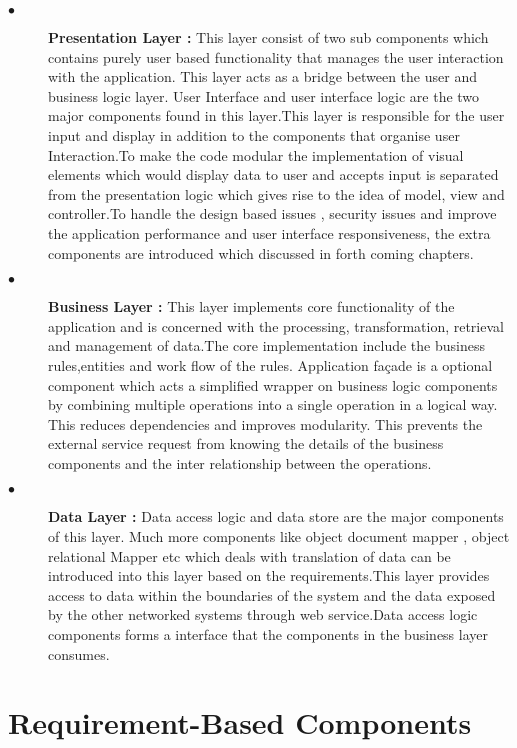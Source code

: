 						
\begin{description}
  \item[$\bullet$] {\bfseries Presentation Layer :} This layer consist of two sub components which contains purely user based functionality that manages the user interaction with the application. This layer acts as a bridge between the user and business logic layer. User Interface and user interface logic are the two major components found in this layer.This layer is responsible for the user input and display in addition to the components that organise user Interaction.To make the code modular the implementation of visual elements which would display data to user and accepts input is separated from the presentation logic which gives rise to the idea of model, view and controller.To handle the design based issues , security issues and improve the application performance and user interface responsiveness, the extra components are introduced which discussed in forth coming chapters.
  \item[$\bullet$] {\bfseries Business Layer :} This layer implements core functionality of the application and is concerned with the processing, transformation, retrieval and management of data.The core implementation include the business rules,entities and work flow of the rules. Application façade is a optional component which acts a simplified wrapper on business logic components by combining multiple operations into a single operation in a logical way. This reduces dependencies and improves modularity. This prevents the external service request from knowing the details of the business components and the inter relationship between the operations.
  \item[$\bullet$] {\bfseries Data Layer :} Data access logic and data store are the major components of this layer. Much more components like object document mapper , object relational Mapper etc which deals with translation of data can be introduced into this layer based on the requirements.This layer provides access to data within the boundaries of the system and the data exposed by the other networked systems through web service.Data access logic components forms a interface that the components in the business layer consumes. 
\end{description}			

\section{ Requirement-Based Components  }

